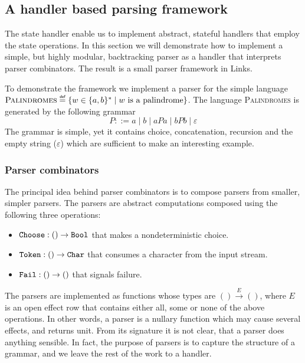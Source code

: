 \subsection{A handler based parsing framework}\label{sec:parserlibrary}
The state handler enable us to implement abstract, stateful handlers that employ the state operations. In this section we will demonstrate how to implement a simple, but highly modular, backtracking parser as a handler that interprets parser combinators. The result is a small parser framework in Links.

To demonstrate the framework we implement a parser for the simple language $\text{\scshape{Palindromes}} \defas \{ w \in \{a,b\}^* \; | \; w\text{ is a palindrome}\}$. The language {\scshape{Palindromes}} is generated by the following grammar
\begin{equation}\label{eq:grammar}
  P ::= a \; | \; b \; | \; aPa \; | \; bPb \; | \; \varepsilon
\end{equation}
The grammar is simple, yet it contains choice, concatenation, recursion and the empty string ($\varepsilon$) which are sufficient to make an interesting example.

\subsubsection{Parser combinators}
The principal idea behind parser combinators is to compose parsers from smaller, simpler parsers. The parsers are abstract computations composed using the following three operations:
\begin{itemize}
  \item $\texttt{Choose} : () \to \texttt{Bool}$ that makes a nondeterministic choice.
  \item $\texttt{Token}  : () \to \texttt{Char}$ that consumes a character from the input stream.
  \item $\texttt{Fail}   : () \to ()$ that signals failure.
\end{itemize}
The parsers are implemented as functions whose types are $() \xrightarrow{E} ()$, where $E$ is an open effect row that contains either all, some or none of the above operations. In other words, a parser is a nullary function which may cause several effects, and returns unit. From its signature it is not clear, that a parser does anything sensible. In fact, the purpose of parsers is to capture the structure of a grammar, and we leave the rest of the work to a handler. 

